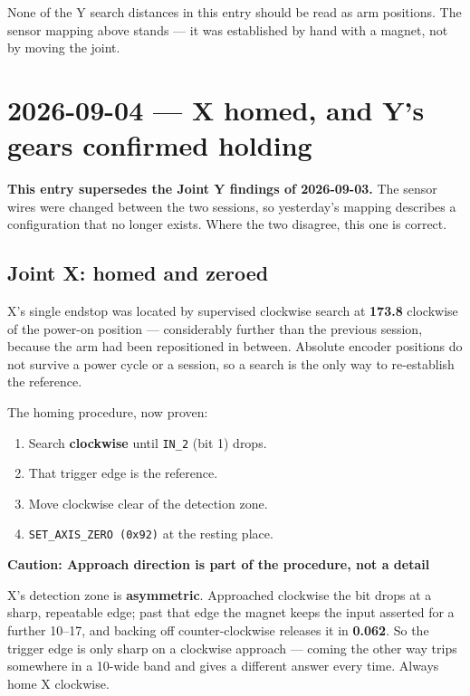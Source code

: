 \documentclass[11pt,letterpaper]{article}
\newenvironment{caution}[1]{%
    \par\addvspace{8pt}%
    \noindent{\color{cautionred}\rule{\linewidth}{0.8pt}}\par\vspace{2pt}
    \noindent\textbf{\color{cautionred}Caution: #1}\par\vspace{2pt}
}{%
    \par\vspace{2pt}\noindent{\color{cautionred}\rule{\linewidth}{0.4pt}}%
    \par\addvspace{8pt}%
}
\begin{document}
None of the Y search distances in this entry should be read as arm positions.
The sensor mapping above stands --- it was established by hand with a magnet, not
by moving the joint.

\section{2026-09-04 --- X homed, and Y's gears confirmed holding}
\label{sec:session-2026-09-04}
\textbf{This entry supersedes the Joint Y findings of 2026-09-03.} The sensor
wires were changed between the two sessions, so yesterday's mapping describes a
configuration that no longer exists. Where the two disagree, this one is correct.

\subsection{Joint X: homed and zeroed}
X's single endstop was located by supervised clockwise search at
\textbf{173.8\textdegree{}} clockwise of the power-on position --- considerably
further than the previous session, because the arm had been repositioned in
between. Absolute encoder positions do not survive a power cycle or a session, so
a search is the only way to re-establish the reference.

The homing procedure, now proven:

\begin{enumerate}
    \item Search \textbf{clockwise} until \texttt{IN\_2} (bit 1) drops.
    \item That trigger edge is the reference.
    \item Move clockwise clear of the detection zone.
    \item \texttt{SET\_AXIS\_ZERO (0x92)} at the resting place.
\end{enumerate}

\begin{caution}{Approach direction is part of the procedure, not a detail}
X's detection zone is \textbf{asymmetric}. Approached clockwise the bit drops at a
sharp, repeatable edge; past that edge the magnet keeps the input asserted for a
further 10--17\textdegree{}, and backing off counter-clockwise releases it in
\textbf{0.062\textdegree{}}. So the trigger edge is only sharp on a clockwise
approach --- coming the other way trips somewhere in a 10\textdegree{}-wide band
and gives a different answer every time. Always home X clockwise.
\end{caution}
\end{document}
